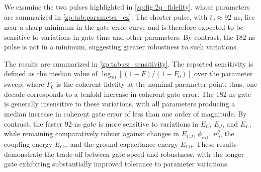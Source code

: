 We examine the two pulses highlighted in \cref{zp:fig:2q_fidelity}, whose parameters are summarized in \cref{zp:tab:parameter_cz}.
The shorter pulse, with $t_g\approx92$ ns, lies near a sharp minimum in the gate-error curve and is therefore expected to be sensitive to variations in gate time and other parameters.
By contrast, the $182$-ns pulse is not in a minimum, suggesting greater robustness to such variations.

The results are summarized in \cref{zp:tab:cz_sensitivity}.
The reported sensitivity is defined as the median value of $\log_{10}[(1-F)/(1-F_0)]$ over the parameter sweep, where $F_0$ is the coherent fidelity at the nominal parameter point; thus, one decade corresponds to a tenfold increase in coherent gate error.
The 182-ns gate is generally insensitive to these variations, with all parameters producing a median increase in coherent gate error of less than one order of magnitude.
By contrast, the faster 92-ns gate is more sensitive to variations in $E_{C}$, $E_{J}$, and $E_{L}$, while remaining comparatively robust against changes in $E_{CJ}$, $\phi_{\mathrm{ext}}$, $n_{g}^{\theta}$, the coupling energy $E_{Cc}$, and the ground-capacitance energy $E_{C0}$.
These results demonstrate the trade-off between gate speed and robustness, with the longer gate exhibiting substantially improved tolerance to parameter variations.
